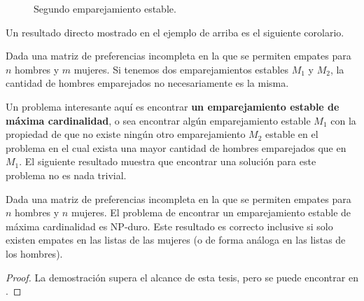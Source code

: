 \begin{eje}{\cite{empates}}
\begin{figure}[H]

\caption{Segundo emparejamiento estable.}
\end{figure}
\fin
\end{eje}

Un resultado directo mostrado en el ejemplo de arriba es el siguiente corolario.

\begin{cor}
Dada una matriz de preferencias incompleta en la que se permiten empates para $n$ hombres y $m$ mujeres. Si tenemos dos emparejamientos estables $M_1$ y $M_2$, la cantidad de hombres emparejados no necesariamente es la misma.
\end{cor}

Un problema interesante aquí es encontrar \textbf{un emparejamiento estable de máxima cardinalidad}, o sea encontrar algún emparejamiento estable $M_1$ con la propiedad de que no existe ningún otro emparejamiento $M_2$ estable en el problema en el cual exista una mayor cantidad de hombres emparejados que en $M_1$. El siguiente resultado muestra que encontrar una solución para este problema no es nada trivial.

\begin{teo} {\cite{empates}} \label{NPempates}
Dada una matriz de preferencias incompleta en la que se permiten empates para $n$ hombres y $n$ mujeres. El problema de encontrar un emparejamiento estable de máxima cardinalidad es NP-duro. Este resultado es correcto inclusive si solo existen empates en las listas de las mujeres (o de forma análoga en las listas de los hombres). 
\end{teo}
\begin{proof}
La demostración supera el alcance de esta tesis, pero se puede encontrar en \cite{empates}. 
\end{proof}















